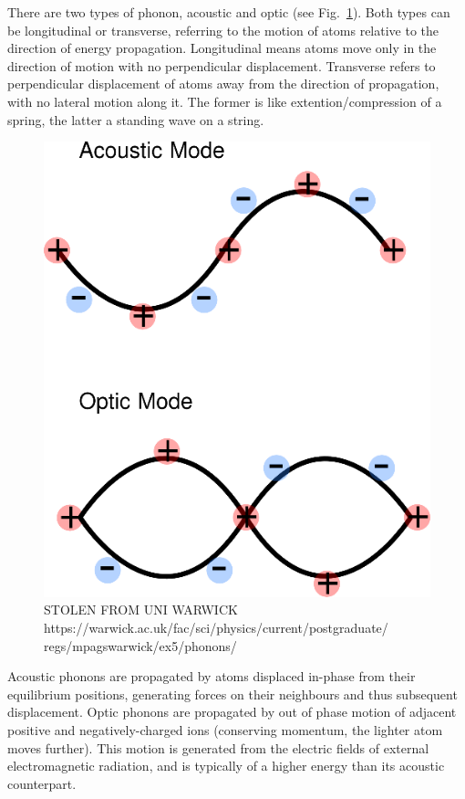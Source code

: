 There are two types of phonon, acoustic and optic (see Fig.~\ref{fig:phonon_diagram}). Both types can be longitudinal or transverse, referring to the motion of atoms relative to the direction of energy propagation. Longitudinal means atoms move only in the direction of motion with no perpendicular displacement. Transverse refers to perpendicular displacement of atoms away from the direction of propagation, with no lateral motion along it. The former is like extention/compression of a spring, the latter a standing wave on a string.
 
\begin{figure}[h!]
  \includegraphics[width=\linewidth]{Figures/phonon-warwick-acoustic-optic-diagram.png}
  \caption[PHONON TYPE DIAGRAM]{STOLEN FROM UNI WARWICK https://warwick.ac.uk/fac/sci/physics/current/postgraduate/
  regs/mpagswarwick/ex5/phonons/}
  \label{fig:phonon_diagram}
\end{figure}

Acoustic phonons are propagated by atoms displaced in-phase from their equilibrium positions, generating forces on their neighbours and thus subsequent displacement. Optic phonons are propagated by out of phase motion of adjacent positive and negatively-charged ions (conserving momentum, the lighter atom moves further). This motion is generated from the electric fields of external electromagnetic radiation, and is typically of a higher energy than its acoustic counterpart. 

